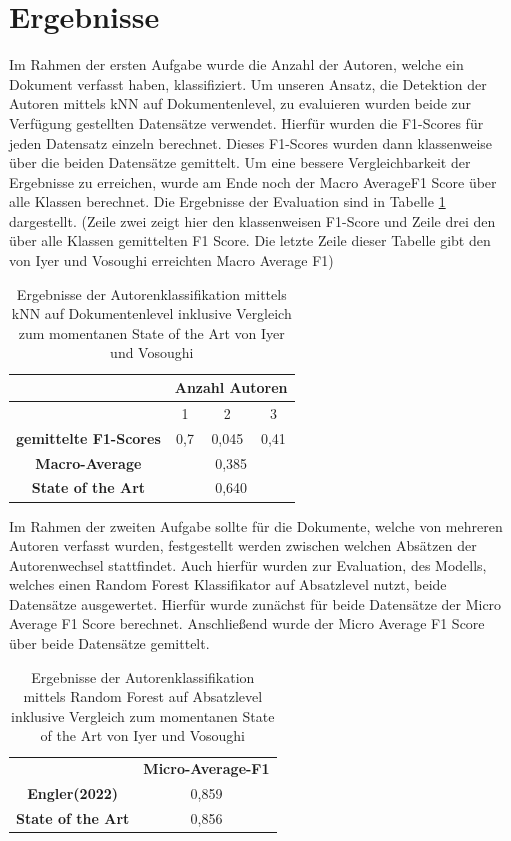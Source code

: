 \documentclass[conference]{IEEEtran}
\begin{document}
\section{Ergebnisse}
	Im Rahmen der ersten Aufgabe wurde die Anzahl der Autoren, welche ein Dokument verfasst haben, klassifiziert. Um unseren Ansatz, die Detektion der Autoren mittels kNN auf Dokumentenlevel, zu evaluieren wurden beide zur Verfügung gestellten Datensätze verwendet. Hierfür wurden die F1-Scores für jeden Datensatz einzeln berechnet. Dieses F1-Scores wurden dann klassenweise über die beiden Datensätze gemittelt. Um eine bessere Vergleichbarkeit der Ergebnisse zu erreichen, wurde am Ende noch der Macro AverageF1 Score über alle Klassen berechnet. Die Ergebnisse der Evaluation sind in Tabelle \ref{tab:erg1} dargestellt. (Zeile zwei zeigt hier den klassenweisen F1-Score und Zeile drei den über alle Klassen gemittelten F1 Score. Die letzte Zeile dieser Tabelle gibt den von Iyer und Vosoughi erreichten Macro Average F1)
	\begin{table}[htbp]
		\caption{Ergebnisse der Autorenklassifikation mittels kNN auf Dokumentenlevel inklusive Vergleich zum momentanen State of the Art von Iyer und Vosoughi}
		\begin{center}
			\begin{tabular}{|c|c|c|c|}
				\hline
				 & \multicolumn{3}{|c|}{Anzahl Autoren} \tabularnewline
				\hline
				 & 1 & 2 & 3 \\
				 \hline
				 \textbf{gemittelte F1-Scores} & 0,7 & 0,045 & 0,41 \\
				 \hline
				 \textbf{Macro-Average} & \multicolumn{3}{|c|}{0,385} \tabularnewline
				 \hline
				 \textbf{State of the Art} & \multicolumn{3}{|c|}{0,640} \tabularnewline
				 \hline
			\end{tabular}
			\label{tab:erg1}
		\end{center}
	\end{table}
	\par\bigskip
	Im Rahmen der zweiten Aufgabe sollte für die Dokumente, welche von mehreren Autoren verfasst wurden, festgestellt werden zwischen welchen Absätzen der Autorenwechsel stattfindet. Auch hierfür wurden zur Evaluation, des Modells, welches einen Random Forest Klassifikator auf Absatzlevel nutzt, beide Datensätze ausgewertet. Hierfür wurde zunächst für beide Datensätze der Micro Average F1 Score berechnet. Anschließend wurde der Micro Average F1 Score über beide Datensätze gemittelt.
	\begin{table}[htbp]
		\caption{Ergebnisse der Autorenklassifikation mittels Random Forest auf Absatzlevel inklusive Vergleich zum momentanen State of the Art von Iyer und Vosoughi}
		\begin{center}
			\begin{tabular}{|cc|}
				\hline
				 & \textbf{Micro-Average-F1} \\
				 \cellcolor{gray!15}\textbf{Engler(2022)} & \cellcolor{gray!15}0,859 \\
				 \textbf{State of the Art} & 0,856 \\
				\hline
			\end{tabular}
			\label{tab:erg2}
		\end{center}
	\end{table}
\end{document}
